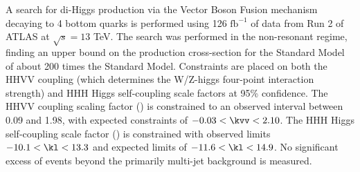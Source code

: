 A search for di-Higgs production via the Vector Boson Fusion mechanism
    decaying to 4 bottom quarks is performed using 
    126 $\textrm{fb}^{-1}$ of data from Run 2 of ATLAS at $\sqrt{s}=13$ TeV.
The search was performed in the non-resonant regime,
    finding an upper bound on the production cross-section
    for the Standard Model \vbfhhproc of about 200 times the Standard Model.
Constraints are placed on both the HHVV coupling
    (which determines the W/Z-higgs four-point interaction strength)
    and HHH Higgs self-coupling scale factors at 95\% confidence.
The HHVV coupling scaling factor (\kvv) is constrained
    to an observed interval between 0.09 and 1.98,
    with expected constraints of $-0.03 < \kvv < 2.10$.
The HHH Higgs self-coupling scale factor (\kl) is constrained
    with observed limits $-10.1 < \kl < 13.3$
    and expected limits of $-11.6 < \kl < 14.9$.
No significant excess of events beyond the primarily multi-jet background is measured.
